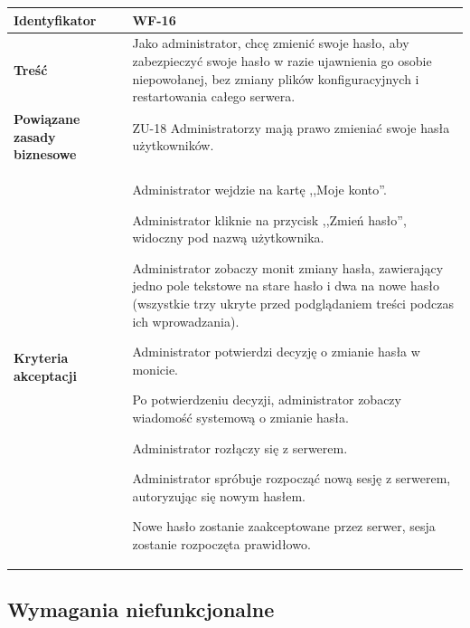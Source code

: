 \begin{tabular}{ | l | l | }
	\hline
		\textbf{Identyfikator} &
		WF-16
		\\

	\hline
		\textbf{Treść} & \parbox[t]{11.5cm}{\strut
			Jako administrator, chcę zmienić swoje hasło, aby zabezpieczyć swoje hasło w razie ujawnienia go osobie niepowołanej, bez zmiany plików konfiguracyjnych i restartowania całego serwera.
		\strut}\\

	\hline
		\parbox[t]{4cm}{\textbf{Powiązane zasady biznesowe}} & \parbox[t]{11.5cm}{\strut
    ZU-18 Administratorzy mają prawo zmieniać swoje hasła
    użytkowników.
		\strut}\\

	\hline
		\parbox[t]{4cm}{\textbf{Kryteria akceptacji}} & \parbox[t]{11.5cm}{\strut
			\begin{enumreq}
				\item Administrator wejdzie na kartę ,,Moje konto''.
        \item Administrator kliknie na przycisk ,,Zmień hasło'',
        widoczny pod nazwą użytkownika.
				\item Administrator zobaczy monit zmiany hasła,
        zawierający jedno pole tekstowe na stare hasło i dwa na
        nowe hasło (wszystkie trzy ukryte przed podglądaniem
        treści podczas ich wprowadzania).
        \item Administrator potwierdzi decyzję o zmianie hasła w monicie.
        \item Po potwierdzeniu decyzji, administrator zobaczy wiadomość systemową o zmianie hasła.
        \item Administrator rozłączy się z serwerem.
        \item Administrator spróbuje rozpocząć nową sesję z
        serwerem, autoryzując się nowym hasłem.
        \item Nowe hasło zostanie zaakceptowane przez serwer,
        sesja zostanie rozpoczęta prawidłowo.
			\end{enumreq}
			\strut}
		\\

	\hline
\end{tabular}

\newpage

\subsection{Wymagania niefunkcjonalne}

